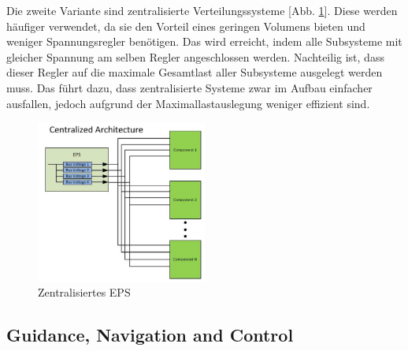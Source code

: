  Die zweite Variante sind zentralisierte Verteilungssysteme [Abb. \ref{c_eps}]. Diese werden häufiger verwendet, da sie den Vorteil eines geringen Volumens bieten und weniger Spannungsregler benötigen. Das wird erreicht, indem alle Subsysteme mit gleicher Spannung am selben Regler angeschlossen werden. Nachteilig ist, dass dieser Regler auf die maximale Gesamtlast aller Subsysteme ausgelegt werden muss. Das führt dazu, dass zentralisierte Systeme zwar im Aufbau einfacher ausfallen, jedoch aufgrund der Maximallastauslegung weniger effizient sind.\cite{Abaker.2017}
\begin{figure}[!h]
	\centering
		\includegraphics[width=0.50\textwidth]{./graphics/Centralized_EPS.PNG}
	\caption{Zentralisiertes EPS \cite{Burt.2011}}
	\label{c_eps}
\end{figure}



		\subsection{Guidance, Navigation and Control}%
		
